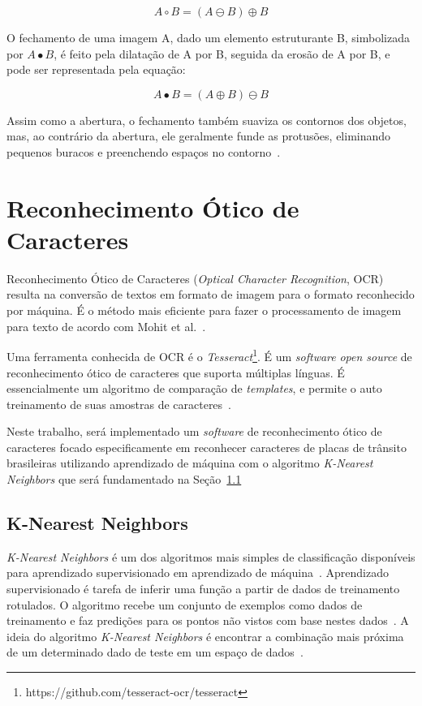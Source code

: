 \begin{displaymath}
A \circ B = (A \ominus B)\oplus B
\end{displaymath}

O fechamento de uma imagem A, dado um elemento estruturante B, simbolizada por
$A \bullet B$, é feito pela dilatação de A por B, seguida da erosão de A por B,
e pode ser representada pela equação:

\begin{displaymath}
A \bullet B = (A \oplus B)\ominus B
\end{displaymath}

Assim como a abertura, o fechamento também suaviza os contornos dos objetos,
mas, ao contrário da abertura, ele geralmente funde  as protusões, eliminando
pequenos buracos e preenchendo espaços no contorno~\cite{gonzalez1977digital}.

\section{Reconhecimento Ótico de Caracteres}
\label{sec:ocr}

Reconhecimento Ótico de Caracteres (\emph{Optical Character Recognition}, OCR)
resulta na conversão de textos em formato de imagem para o formato reconhecido
por máquina. É o método mais eficiente para fazer o processamento de imagem para
texto de acordo com Mohit et al.~\cite{mohit2015designing}.

Uma ferramenta conhecida de OCR é o
\emph{Tesseract}\footnote{https://github.com/tesseract-ocr/tesseract}. É um
\emph{software} \emph{open source} de reconhecimento ótico de caracteres que
suporta múltiplas línguas.  É essencialmente um algoritmo de comparação de
\emph{templates}, e permite o auto treinamento de suas amostras de
caracteres~\cite{ho2016intelligent}.

Neste trabalho, será implementado um \emph{software} de reconhecimento ótico de
caracteres focado especificamente em reconhecer caracteres de placas de trânsito
brasileiras utilizando aprendizado de máquina com o algoritmo \emph{K-Nearest
Neighbors} que será fundamentado na Seção~\ref{sec:knearest}

\subsection{K-Nearest Neighbors}
\label{sec:knearest}

\emph{K-Nearest Neighbors} é um dos algoritmos mais simples de classificação
disponíveis para aprendizado supervisionado em aprendizado de
máquina~\cite{opencv2014knearest}. Aprendizado supervisionado é tarefa de
inferir uma função a partir de dados de treinamento rotulados. O algoritmo
recebe um conjunto de exemplos como dados de treinamento e faz predições para os
pontos não vistos com base nestes dados~\cite{mohri2012foundations}. A ideia do
algoritmo \emph{K-Nearest Neighbors} é encontrar a combinação mais próxima de um
determinado dado de teste em um espaço de dados~\cite{opencv2014knearest}.

